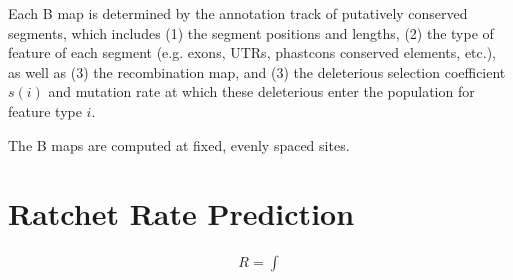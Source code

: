 \documentclass[11pt]{article}
\begin{document}
Each B map is determined by the annotation track of putatively conserved
segments, which includes (1) the segment positions and lengths, (2) the type of
feature of each segment (e.g.  exons, UTRs, phastcons conserved elements,
etc.), as well as (3) the recombination map, and (3) the deleterious selection
coefficient $s(i)$ and mutation rate at which these deleterious enter the
population for feature type $i$.

The B maps are computed at fixed, evenly spaced sites.

\section{Ratchet Rate Prediction}

\begin{align}
  R = \int 
\end{align}

\printbibliography
\end{document}
